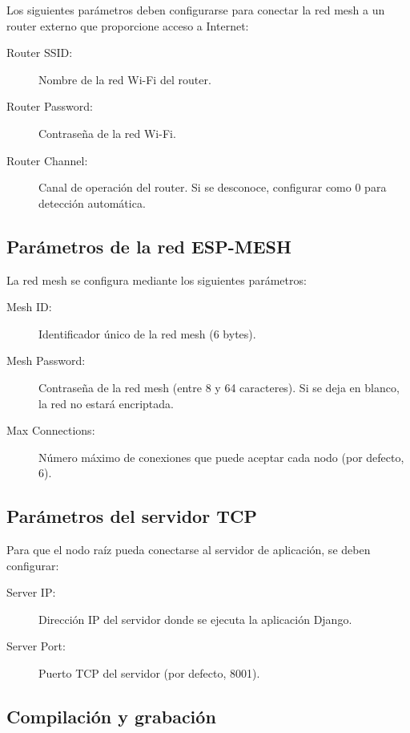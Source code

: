 \documentclass[a4paper, 12pt]{report}
\begin{document}
Los siguientes parámetros deben configurarse para conectar la red mesh a
un router externo que proporcione acceso a Internet:

\begin{description}
  \item[Router SSID:] Nombre de la red Wi-Fi del router.
  \item[Router Password:] Contraseña de la red Wi-Fi.
  \item[Router Channel:] Canal de operación del router. Si se desconoce,
    configurar como 0 para detección automática.
\end{description}

\subsection{Parámetros de la red ESP-MESH}

La red mesh se configura mediante los siguientes parámetros:

\begin{description}
  \item[Mesh ID:] Identificador único de la red mesh (6 bytes).
  \item[Mesh Password:] Contraseña de la red mesh (entre 8 y 64 caracteres).
    Si se deja en blanco, la red no estará encriptada.
  \item[Max Connections:] Número máximo de conexiones que puede aceptar
    cada nodo (por defecto, 6).
\end{description}

\subsection{Parámetros del servidor TCP}

Para que el nodo raíz pueda conectarse al servidor de aplicación, se
deben configurar:

\begin{description}
  \item[Server IP:] Dirección IP del servidor donde se ejecuta la
    aplicación Django.
  \item[Server Port:] Puerto TCP del servidor (por defecto, 8001).
\end{description}

\subsection{Compilación y grabación}
\end{document}
